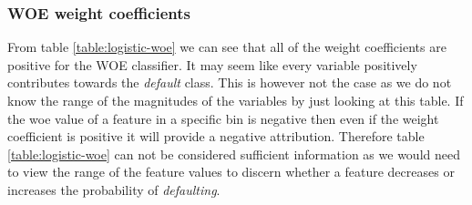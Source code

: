 \subsubsection{WOE weight coefficients}
From table \ref{table:logistic-woe} we can see that all of the weight coefficients are positive for the WOE classifier. It may seem like every variable positively contributes towards the \emph{default} class. This is however not the case as we do not know the range of the magnitudes of the variables by just looking at this table. If the woe value of a feature in a specific bin is negative then even if the weight coefficient is positive it will provide a negative attribution. Therefore table \ref{table:logistic-woe} can not be considered sufficient information as we would need to view the range of the feature values to discern whether a feature decreases or increases the probability of \emph{defaulting}.

